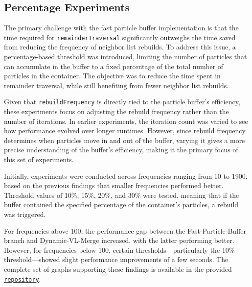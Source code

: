 

\subsection{Percentage Experiments}

The primary challenge with the fast particle buffer implementation is that the time required for \texttt{remainderTraversal} significantly outweighs the time saved from reducing the frequency of neighbor list rebuilds. To address this issue, a percentage-based threshold was introduced, limiting the number of particles that can accumulate in the buffer to a fixed percentage of the total number of particles in the container. The objective was to reduce the time spent in remainder traversal, while still benefiting from fewer neighbor list rebuilds.

Given that \texttt{rebuildFrequency} is directly tied to the particle buffer's efficiency, these experiments focus on adjusting the rebuild frequency rather than the number of iterations. In earlier experiments, the iteration count was varied to see how performance evolved over longer runtimes. However, since rebuild frequency determines when particles move in and out of the buffer, varying it gives a more precise understanding of the buffer's efficiency, making it the primary focus of this set of experiments.

Initially, experiments were conducted across frequencies ranging from 10 to 1900, based on the previous findings that smaller frequencies performed better. Threshold values of 10\%, 15\%, 20\%, and 30\% were tested, meaning that if the buffer contained the specified percentage of the container's particles, a rebuild was triggered.

For frequencies above 100, the performance gap between the Fast-Particle-Buffer branch and Dynamic-VL-Merge increased, with the latter performing better. However, for frequencies below 100, certain thresholds—particularly the 10\% threshold—showed slight performance improvements of a few seconds. The complete set of graphs supporting these findings is available in the provided \href{https://github.com/xhulia028/GraphView}{\texttt{repository}}.


